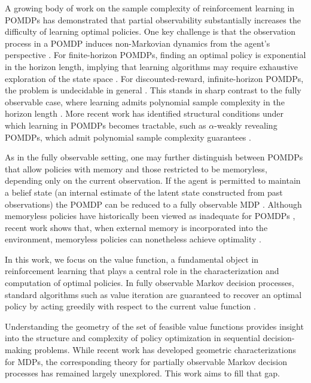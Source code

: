 \documentclass{article}
\theoremstyle{definition}
\theoremstyle{remark}
\begin{document}
A growing body of work on the sample complexity of reinforcement learning in POMDPs has demonstrated that partial observability substantially increases the difficulty of learning optimal policies. One key challenge is that the observation process in a POMDP induces non-Markovian dynamics from the agent's perspective \citep{chenPartiallyObservableRL2022}. For finite-horizon POMDPs, finding an optimal policy is exponential in the horizon length, implying that learning algorithms may require exhaustive exploration of the state space \citep{krishnamurthyPACReinforcementLearning2016}. For discounted-reward, infinite-horizon POMDPs, the problem is undecidable in general \citep{papadimitriouComplexityMarkovDecision1987,madaniUndecidabilityProbabilisticPlanning2003}. 
%
This stands in sharp contrast to the fully observable case, where learning admits polynomial sample complexity in the horizon length \citep{azarMinimaxRegretBounds2017}. More recent work has identified structural conditions under which learning in POMDPs becomes tractable, such as $\alpha$-weakly revealing POMDPs, which admit polynomial sample complexity guarantees \citep{liuSampleEfficientReinforcementLearning2022}. 

As in the fully observable setting, one may further distinguish between POMDPs that allow policies with memory and those restricted to be memoryless, depending only on the current observation. If the agent is permitted to maintain a belief state (an internal estimate of the latent state constructed from past observations) the POMDP can be reduced to a fully observable MDP \citep{astromOptimalControlMarkov1965,JMLR:v23:20-1165}. 
%
Although memoryless policies have historically been viewed as inadequate for POMDPs \citep{cohenFutureMemoriesAre2023}, recent work shows that, when external memory is incorporated into the environment, memoryless policies can nonetheless achieve optimality \citep{toroicarteLearningRewardMachines2023}. 

In this work, we focus on the value function, a fundamental object in reinforcement learning that plays a central role in the characterization and computation of optimal policies. In fully observable Markov decision processes, standard algorithms such as value iteration are guaranteed to recover an optimal policy by acting greedily with respect to the current value function \citep{putermanMarkovDecisionProcesses2005}. 

Understanding the geometry of the set of feasible value functions provides insight into the structure and complexity of policy optimization in sequential decision-making problems. While recent work has developed geometric characterizations for MDPs, the corresponding theory for partially observable Markov decision processes has remained largely unexplored. This work aims to fill that gap. 
\end{document}
